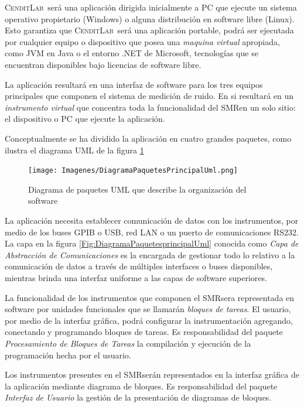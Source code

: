 \documentclass[paper=a4,oneside,fontsize=12pt]{article}
\newcommand{\AppName}{\textsc{CenditLab}\ }
\newcommand{\smr}{sistema de medición de ruido}
\newcommand{\SMR}{SMR}
\begin{document}
	\AppName será una aplicación dirigida inicialmente a PC que ejecute un sistema operativo propietario (Windows) o alguna distribución en software libre (Linux). Esto garantiza que \AppName será una aplicación portable, podrá ser ejecutada por cualquier equipo o dispositivo que posea una \emph{maquina virtual} apropiada, como JVM en Java o el entorno .NET de Microsoft, tecnologías que se encuentran disponibles bajo licencias de software libre.
	
	La aplicación resultará en una interfaz de software para los tres equipos principales que componen el \smr. En si resultará en un \emph{instrumento virtual} que concentra toda la funcionalidad del \SMR en un solo sitio: el dispositivo o PC que ejecute la aplicación.
	
	Conceptualmente se ha dividido la aplicación en cuatro grandes paquetes, como ilustra el diagrama UML de la figura \ref{Fig:DiagramaPaquetesPrincipalUml}
	
	\begin{figure}[H]
		\centering
		\texttt{[image: Imagenes/DiagramaPaquetesPrincipalUml.png]}
		\caption{Diagrama de paquetes UML que describe la organización del software}
		\label{Fig:DiagramaPaquetesPrincipalUml}
	\end{figure}

	La aplicación necesita establecer comunicación de datos con los instrumentos, por medio de los buses GPIB o USB, red LAN o un puerto de comunicaciones RS232. La capa en la figura \ref{Fig:DiagramaPaquetesprincipalUml} conocida como \emph{Capa de Abstracción de Comunicaciones} es la encargada de gestionar todo lo relativo a la comunicación de datos a través de múltiples interfaces o buses disponibles, mientras brinda una interfaz uniforme a las capas de software superiores.
	
	La funcionalidad de los instrumentos que componen el \SMR sera representada en software por unidades funcionales que se llamarán  \emph{bloques de tareas}. El usuario, por medio de la interfaz gráfica, podrá configurar la instrumentación agregando, conectando y programando bloques de tareas. Es responsabilidad del paquete \emph{Procesamiento de Bloques de Tareas} la compilación y ejecución de la programación hecha por el usuario.
	
	Los instrumentos presentes en el \SMR serán representados en la interfaz gráfica de la aplicación mediante diagrama de bloques. Es responsabilidad del paquete \emph{Interfaz de Usuario} la gestión de la presentación de diagramas de bloques.
	
\end{document}

